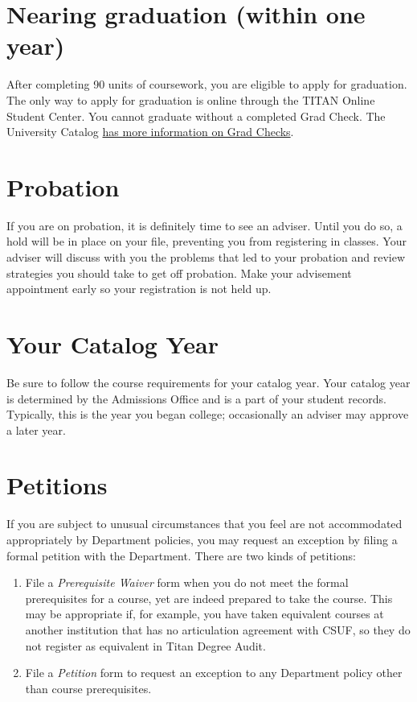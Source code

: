 \documentclass{book}
\newcommand{\campusname}{CSUF}
\begin{document}
\section{Nearing graduation (within one year)}
After completing 90 units of coursework, you are eligible to apply for graduation. The only way to apply for graduation is online through the TITAN Online Student Center. You cannot graduate without a completed Grad Check.  The University Catalog \href{http://catalog.fullerton.edu/content.php?catoid=2&navoid=108#Graduation_Requirement_Check}{has more information on Grad Checks}.

\section{Probation}
If you are on probation, it is definitely time to see an adviser. Until you do so, a hold will be in place on your file, preventing you from registering in classes. Your adviser will discuss with you the problems that led to your probation and review strategies you should take to get off probation. Make your advisement appointment early so your registration is not held up.

\section{Your Catalog Year}
Be sure to follow the course requirements for your catalog year. Your catalog year is determined by the Admissions Office and is a part of your student records. Typically, this is the year you began college; occasionally an adviser may approve a later year.

\section{Petitions}
\label{section:petitions}

If you are subject to unusual circumstances that you feel are not accommodated appropriately by Department policies, you may request an exception by filing a formal petition with the Department. There are two kinds of petitions:
\begin{enumerate}
\item File a \emph{Prerequisite Waiver} form when you do not meet the formal prerequisites for a course, yet are indeed prepared to take the course. This may be appropriate if, for example, you have taken equivalent courses at another institution that has no articulation agreement with \campusname, so they do not register as equivalent in Titan Degree Audit.
\item File a \emph{Petition} form to request an exception to any Department policy other than course prerequisites.
\end{enumerate}
\end{document}

